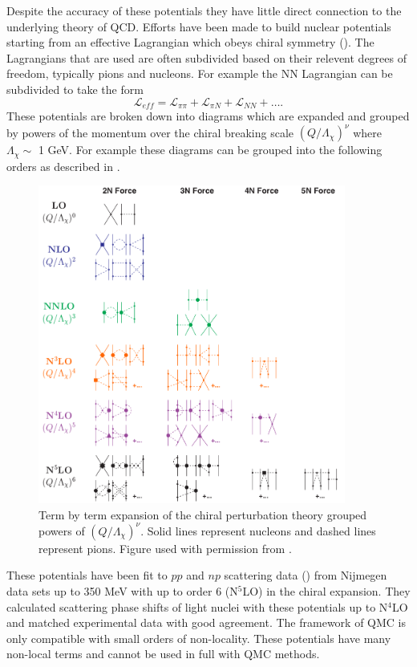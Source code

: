 Despite the accuracy of these potentials they have little direct connection to the underlying theory of QCD. Efforts have been made to build nuclear potentials starting from an effective Lagrangian which obeys chiral symmetry (\cite{entem2017}). The Lagrangians that are used are often subdivided based on their relevent degrees of freedom, typically pions and nucleons. For example the NN Lagrangian can be subdivided to take the form
\begin{equation}
   \mathcal{L}_{eff} = \mathcal{L}_{\pi\pi} + \mathcal{L}_{\pi N} + \mathcal{L}_{NN} + \ldots.
\end{equation}
These potentials are broken down into diagrams which are expanded and grouped by powers of the momentum over the chiral breaking scale $(Q/\Lambda_\chi)^\nu$ where $\Lambda_\chi \sim$ 1 GeV. For example these diagrams can be grouped into the following orders as described in \cite{entem2017}.
\begin{figure}[h!]
   \centering
   \includegraphics[width=0.9\textwidth]{figures/chi_expansion.png}
   \caption{Term by term expansion of the chiral perturbation theory grouped powers of $(Q/\Lambda_\chi)^\nu$. Solid lines represent nucleons and dashed lines represent pions. Figure used with permission from \cite{entem2017}.}
\end{figure}
These potentials have been fit to $pp$ and $np$ scattering data (\cite{stoks1993,stoks1993_2}) from Nijmegen data sets up to 350 MeV with up to order 6 (N$^5$LO) in the chiral expansion. They calculated scattering phase shifts of light nuclei with these potentials up to N$^4$LO and matched experimental data with good agreement. The framework of QMC is only compatible with small orders of non-locality. These potentials have many non-local terms and cannot be used in full with QMC methods.

